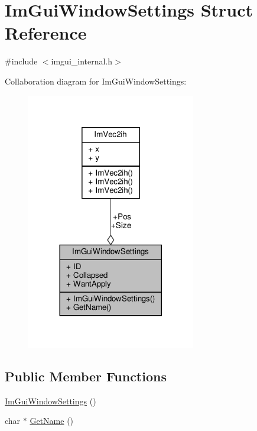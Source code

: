 \hypertarget{structImGuiWindowSettings}{}\section{Im\+Gui\+Window\+Settings Struct Reference}
\label{structImGuiWindowSettings}


{\ttfamily \#include $<$imgui\+\_\+internal.\+h$>$}



Collaboration diagram for Im\+Gui\+Window\+Settings\+:
\nopagebreak
\begin{figure}[H]
\begin{center}
\leavevmode
\includegraphics[width=209pt]{structImGuiWindowSettings__coll__graph}
\end{center}
\end{figure}
\subsection*{Public Member Functions}
\begin{DoxyCompactItemize}
\item 
\hyperlink{structImGuiWindowSettings_a694e496dba59b5aaabe14cce66309acd}{Im\+Gui\+Window\+Settings} ()
\item 
char $\ast$ \hyperlink{structImGuiWindowSettings_aeb65945139ec9f3bfaf5b11040419373}{Get\+Name} ()
\end{DoxyCompactItemize}
